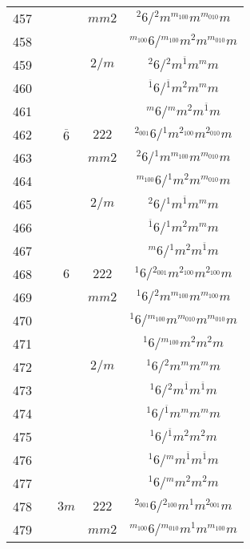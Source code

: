 \begin{longtable}{ccccc}
  457 &  &  & $mm2$ & ${}^{2} 6  / {}^{2} m {}^{m_{100}} m {}^{m_{010}} m $\\
  458 &  &  &  & ${}^{m_{100}} 6  / {}^{m_{100}} m {}^{2} m {}^{m_{010}} m $\\
  459 &  &  & $2/m$ & ${}^{2} 6  / {}^{2} m {}^{\overline{1}} m {}^{m} m $\\
  460 &  &  &  & ${}^{\overline{1}} 6  / {}^{\overline{1}} m {}^{2} m {}^{m} m $\\
  461 &  &  &  & ${}^{m} 6  / {}^{m} m {}^{2} m {}^{\overline{1}} m $\\
  462 &  & $\overline{6}$ & $222$ & ${}^{2_{001}} 6  / {}^{1} m {}^{2_{100}} m {}^{2_{010}} m $\\
  463 &  &  & $mm2$ & ${}^{2} 6  / {}^{1} m {}^{m_{100}} m {}^{m_{010}} m $\\
  464 &  &  &  & ${}^{m_{100}} 6  / {}^{1} m {}^{2} m {}^{m_{010}} m $\\
  465 &  &  & $2/m$ & ${}^{2} 6  / {}^{1} m {}^{\overline{1}} m {}^{m} m $\\
  466 &  &  &  & ${}^{\overline{1}} 6  / {}^{1} m {}^{2} m {}^{m} m $\\
  467 &  &  &  & ${}^{m} 6  / {}^{1} m {}^{2} m {}^{\overline{1}} m $\\
  468 &  & $6$ & $222$ & ${}^{1} 6  / {}^{2_{001}} m {}^{2_{100}} m {}^{2_{100}} m $\\
  469 &  &  & $mm2$ & ${}^{1} 6  / {}^{2} m {}^{m_{100}} m {}^{m_{100}} m $\\
  470 &  &  &  & ${}^{1} 6  / {}^{m_{100}} m {}^{m_{010}} m {}^{m_{010}} m $\\
  471 &  &  &  & ${}^{1} 6  / {}^{m_{100}} m {}^{2} m {}^{2} m $\\
  472 &  &  & $2/m$ & ${}^{1} 6  / {}^{2} m {}^{m} m {}^{m} m $\\
  473 &  &  &  & ${}^{1} 6  / {}^{2} m {}^{\overline{1}} m {}^{\overline{1}} m $\\
  474 &  &  &  & ${}^{1} 6  / {}^{\overline{1}} m {}^{m} m {}^{m} m $\\
  475 &  &  &  & ${}^{1} 6  / {}^{\overline{1}} m {}^{2} m {}^{2} m $\\
  476 &  &  &  & ${}^{1} 6  / {}^{m} m {}^{\overline{1}} m {}^{\overline{1}} m $\\
  477 &  &  &  & ${}^{1} 6  / {}^{m} m {}^{2} m {}^{2} m $\\
  478 &  & $3m$ & $222$ & ${}^{2_{001}} 6  / {}^{2_{100}} m {}^{1} m {}^{2_{001}} m $\\
  479 &  &  & $mm2$ & ${}^{m_{100}} 6  / {}^{m_{010}} m {}^{1} m {}^{m_{100}} m $\\

\end{longtable}
